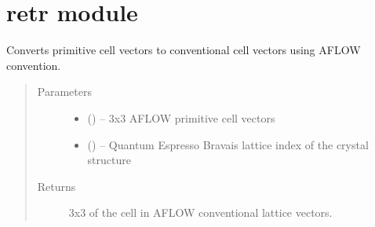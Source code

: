 \documentclass[letterpaper,10pt,english]{sphinxmanual}
\begin{document}
\chapter{retr module}
\label{\detokenize{retr::doc}}\label{\detokenize{retr:retr-module}}\label{\detokenize{retr:module-retr}}

\begin{fulllineitems}
\label{\detokenize{retr:retr.aflow_prim2conv}}
Converts primitive cell vectors to conventional cell vectors using AFLOW
convention.
\begin{quote}\begin{description}
\item[{Parameters}] \leavevmode\begin{itemize}
\item {} 
 () -- 3x3 AFLOW primitive cell vectors

\item {} 
 () -- Quantum Espresso Bravais lattice index of the crystal
structure

\end{itemize}

\item[{Returns}] \leavevmode
3x3  of the cell in AFLOW conventional lattice vectors.

\end{description}\end{quote}

\end{fulllineitems}

\end{document}
